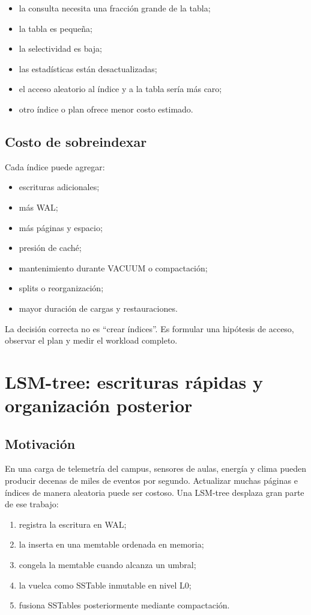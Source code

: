 \documentclass[variant=apuntes,cover=institutional,mode=screen]{ua-engineering-v6-article}
\begin{document}
\begin{itemize}
\item la consulta necesita una fracción grande de la tabla;
\item la tabla es pequeña;
\item la selectividad es baja;
\item las estadísticas están desactualizadas;
\item el acceso aleatorio al índice y a la tabla sería más caro;
\item otro índice o plan ofrece menor costo estimado.
\end{itemize}

\subsection{Costo de sobreindexar}

Cada índice puede agregar:

\begin{itemize}
\item escrituras adicionales;
\item más WAL;
\item más páginas y espacio;
\item presión de caché;
\item mantenimiento durante VACUUM o compactación;
\item splits o reorganización;
\item mayor duración de cargas y restauraciones.
\end{itemize}

La decisión correcta no es ``crear índices''. Es formular una hipótesis de acceso, observar el plan y medir el workload completo.

\section{LSM-tree: escrituras rápidas y organización posterior}

\subsection{Motivación}

En una carga de telemetría del campus, sensores de aulas, energía y clima pueden producir decenas de miles de eventos por segundo. Actualizar muchas páginas e índices de manera aleatoria puede ser costoso. Una LSM-tree desplaza gran parte de ese trabajo:

\begin{enumerate}
\item registra la escritura en WAL;
\item la inserta en una memtable ordenada en memoria;
\item congela la memtable cuando alcanza un umbral;
\item la vuelca como SSTable inmutable en nivel L0;
\item fusiona SSTables posteriormente mediante compactación.
\end{enumerate}
\end{document}
